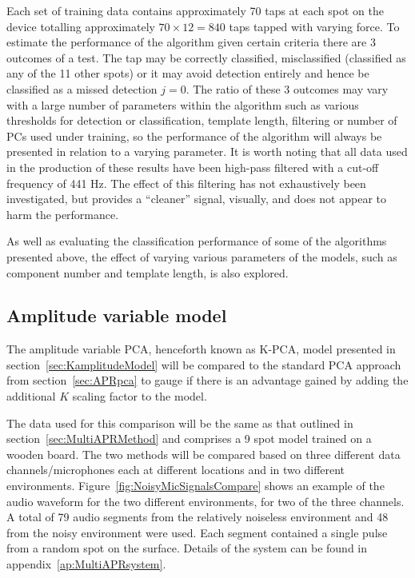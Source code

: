 Each set of training data contains approximately 70 taps at each spot on the device totalling approximately $70 \times 12 = 840$ taps tapped with varying force. To estimate the performance of the algorithm given certain criteria there are 3 outcomes of a test. The tap may be correctly classified, misclassified (classified as any of the 11 other spots) or it may avoid detection entirely and hence be classified as a missed detection $j=0$. The ratio of these 3 outcomes may vary with a large number of parameters within the algorithm such as various thresholds for detection or classification, template length, filtering or number of PCs used under training, so the performance of the algorithm will always be presented in relation to a varying parameter. It is worth noting that all data used in the production of these results have been high-pass filtered with a cut-off frequency of 441 Hz. The effect of this filtering has not exhaustively been investigated, but provides a ``cleaner'' signal, visually, and does not appear to harm the performance.

As well as evaluating the classification performance of some of the algorithms presented above, the effect of varying various parameters of the models, such as component number and template length, is also explored.

\subsection{Amplitude variable model}
The amplitude variable PCA, henceforth known as K-PCA, model presented in section~\ref{sec:KamplitudeModel} will be compared to the standard PCA approach from section~\ref{sec:APRpca} to gauge if there is an advantage gained by adding the additional $K$ scaling factor to the model.

The data used for this comparison will be the same as that outlined in section~\ref{sec:MultiAPRMethod} and comprises a 9 spot model trained on a wooden board. The two methods will be compared based on three different data channels/microphones each at different locations and in two different environments. Figure~\ref{fig:NoisyMicSignalsCompare} shows an example of the audio waveform for the two different environments, for two of the three channels. A total of 79 audio segments from the relatively noiseless environment and 48 from the noisy environment were used. Each segment contained a single pulse from a random spot on the surface. Details of the system can be found in appendix~\ref{ap:MultiAPRsystem}.

